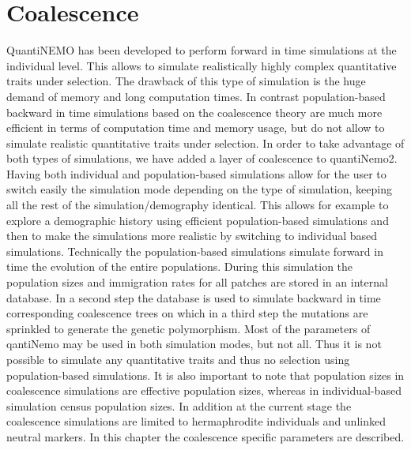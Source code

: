 \documentclass[letterpaper,12pt,oneside]{book}
\begin{document}
\chapter{Coalescence}\label{chap:coalescence}
QuantiNEMO has been developed to perform forward in time simulations at the individual level. This allows to simulate realistically highly complex quantitative traits under selection. The drawback of this type of simulation is the huge demand of memory and long computation times. In contrast population-based backward in time simulations based on the coalescence theory are much more efficient in terms of computation time and memory usage, but do not allow to simulate realistic quantitative traits under selection. In order to take advantage of both types of simulations, we have added a layer of coalescence to quantiNemo2. Having both individual and population-based simulations allow for the user to switch easily the simulation mode depending on the type of simulation, keeping all the rest of the simulation/demography identical. This allows for example to explore a demographic history using efficient population-based simulations and then to make the simulations more realistic by switching to individual based simulations. Technically the population-based simulations simulate forward in time the evolution of the entire populations. During this simulation the population sizes and immigration rates for all patches are stored in an internal database. In a second step the database is used to simulate backward in time corresponding coalescence trees on which in a third step the mutations are sprinkled to generate the genetic polymorphism.
Most of the parameters of qantiNemo may be used in both simulation modes, but not all. Thus it is not possible to simulate any quantitative traits and thus no selection using population-based simulations. It is also important to note that population sizes in coalescence simulations are effective population sizes, whereas in individual-based simulation census population sizes. In addition at the current stage the coalescence simulations are limited to hermaphrodite individuals and unlinked neutral markers. In this chapter the coalescence specific parameters are described.
\end{document}

